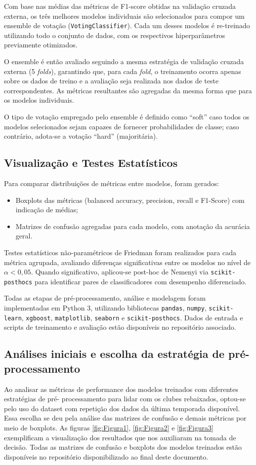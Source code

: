 \documentclass[a4paper]{article}
\theoremstyle{plain}
\theoremstyle{definition}
\begin{document}
Com base nas médias das métricas de F1-score obtidas na validação cruzada externa, os três melhores modelos individuais são selecionados para compor um ensemble de votação (\texttt{VotingClassifier}). Cada um desses modelos é re-treinado utilizando todo o conjunto de dados, com os respectivos hiperparâmetros previamente otimizados.

O ensemble é então avaliado seguindo a mesma estratégia de validação cruzada externa (5 \textit{folds}), garantindo que, para cada \textit{fold}, o treinamento ocorra apenas sobre os dados de treino e a avaliação seja realizada nos dados de teste correspondentes. As métricas resultantes são agregadas da mesma forma que para os modelos individuais.

O tipo de votação empregado pelo ensemble é definido como ``soft'' caso todos os modelos selecionados sejam capazes de fornecer probabilidades de classe; caso contrário, adota-se a votação ``hard'' (majoritária).


\subsection{Visualização e Testes Estatísticos}
Para comparar distribuições de métricas entre modelos, foram gerados:
\begin{itemize}
\item Boxplots das métricas (balanced accuracy, precision, recall e F1-Score) com indicação de médias;
\item Matrizes de confusão agregadas para cada modelo, com anotação da acurácia geral.
\end{itemize}

Testes estatísticos não-paramétricos de Friedman foram realizados para cada métrica agrupada, avaliando diferenças significativas entre os modelos no nível de $\alpha<0{,}05$. Quando significativo, aplicou-se post-hoc de Nemenyi via \texttt{scikit-posthocs} para identificar pares de classificadores com desempenho diferenciado.

Todas as etapas de pré-processamento, análise e modelagem foram implementadas em Python 3, utilizando bibliotecas \texttt{pandas}, \texttt{numpy}, \texttt{scikit-learn}, \texttt{xgboost}, \texttt{matplotlib}, \texttt{seaborn} e \texttt{scikit-posthocs}. Dados de entrada e scripts de treinamento e avaliação estão disponíveis no repositório associado.

\subsection{Análises iniciais e escolha da estratégia de pré-processamento}
Ao analisar as métricas de performance dos modelos treinados com diferentes estratégias de pré- processamento para lidar com os clubes rebaixados, optou-se pelo uso do dataset com repetição dos dados da última temporada disponível. Essa escolha se deu pela análise das matrizes de confusão e demais métricas por meio de boxplots. As figuras \ref{fig:Figura1}, \ref{fig:Figura2} e \ref{fig:Figura3} exemplificam a visualização dos resultados que nos auxiliaram na tomada de decisão. Todas as matrizes de confusão e boxplots dos modelos treinados estão disponíveis no repositório disponibilizado ao final deste documento.
\end{document}
